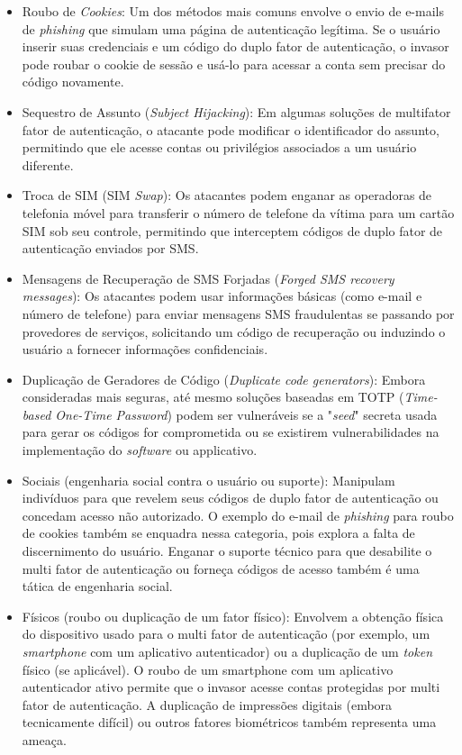 \documentclass[12pt]{article}
\begin{document}
\begin{itemize}
  \item Roubo de \textit{Cookies}: Um dos métodos mais comuns envolve o envio de e-mails de
  \textit{phishing} que simulam uma página de autenticação legítima.
  Se o usuário inserir suas credenciais e um código do duplo fator de autenticação, o invasor
  pode roubar o cookie de sessão e usá-lo para acessar a conta sem precisar do código
  novamente.
  \item Sequestro de Assunto (\textit{Subject Hijacking}): Em algumas soluções de multifator fator de
  autenticação, o atacante pode modificar o identificador do assunto, permitindo que ele
  acesse contas ou privilégios associados a um usuário diferente.
  \item Troca de SIM (SIM \textit{Swap}): Os atacantes podem enganar as operadoras de telefonia móvel
  para transferir o número de telefone da vítima para um cartão SIM sob seu controle,
  permitindo que interceptem códigos de duplo fator de autenticação enviados por SMS.
  \item Mensagens de Recuperação de SMS Forjadas (\textit{Forged SMS recovery messages}): Os
  atacantes podem usar informações básicas (como e-mail e número de telefone) para enviar
  mensagens SMS fraudulentas se passando por provedores de serviços, solicitando um código de
  recuperação ou induzindo o usuário a fornecer informações confidenciais.
  \item Duplicação de Geradores de Código (\textit{Duplicate code generators}): Embora consideradas
  mais seguras, até mesmo soluções baseadas em TOTP (\textit{Time-based One-Time Password}) podem ser
  vulneráveis se a "\textit{seed}" secreta usada para gerar os códigos for comprometida ou se
  existirem vulnerabilidades na implementação do \textit{software} ou  applicativo.
  \item Sociais (engenharia social contra o usuário ou suporte): Manipulam indivíduos para
  que revelem seus códigos de duplo fator de autenticação ou concedam acesso não autorizado.
  O exemplo do e-mail de \textit{phishing} para roubo de cookies também se enquadra nessa categoria,
  pois explora a falta de discernimento do usuário.
  Enganar o suporte técnico para que desabilite o multi fator de autenticação ou forneça
  códigos de acesso também é uma tática de engenharia social.
  \item Físicos (roubo ou duplicação de um fator físico): Envolvem a obtenção física do
  dispositivo usado para o multi fator de autenticação (por exemplo, um \textit{smartphone} com um
  aplicativo autenticador) ou a duplicação de um \textit{token} físico (se aplicável).
  O roubo de um smartphone com um aplicativo autenticador ativo permite que o invasor acesse
  contas protegidas por multi fator de autenticação.
  A duplicação de impressões digitais (embora tecnicamente difícil) ou outros fatores
  biométricos também representa uma ameaça.
\end{itemize}
\end{document}
